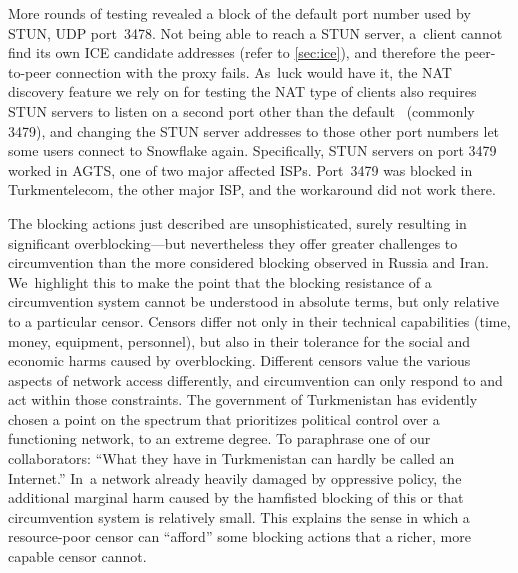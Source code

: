 \documentclass[letterpaper,twocolumn]{article}
\begin{document}
More rounds of testing revealed a block of the default port number
used by STUN, UDP port~3478.
Not being able to reach a STUN server,
a~client cannot find its own ICE candidate addresses
(refer to \autoref{sec:ice}),
and therefore the peer-to-peer connection with the proxy fails.
As~luck would have it, the NAT discovery feature we rely on
for testing the NAT type of clients also requires
STUN servers to listen on a second port other than the default~\cite[\S 6]{rfc5780}
(commonly 3479),
and changing the STUN server addresses to those other port numbers
let some users connect to Snowflake again.
Specifically, STUN servers on port 3479 worked in AGTS,
one of two major affected ISPs.
Port~3479 was blocked in Turkmentelecom, the other major ISP,
and the workaround did not work there.


The blocking actions just described are unsophisticated,
surely resulting in significant overblocking---but
nevertheless they offer greater challenges to circumvention
than the more considered blocking observed in Russia and Iran.
We~highlight this to make the point that the blocking resistance
of a circumvention system cannot be understood in absolute terms,
but only relative to a particular censor.
Censors differ not only in their technical capabilities
(time, money, equipment, personnel),
but also in their tolerance for the social and economic harms caused by overblocking.
Different censors value the various aspects of network access differently,
and circumvention can only respond to and act within those constraints.
The government of Turkmenistan has evidently chosen
a point on the spectrum that prioritizes political control
over a functioning network, to an extreme degree.
To paraphrase one of our collaborators:
``What they have in Turkmenistan can hardly be called an Internet.''
In~a network already heavily damaged by oppressive policy,
the additional marginal harm caused by the hamfisted blocking
of this or that circumvention system is relatively small.
This explains the sense in which a resource-poor censor
can ``afford'' some blocking actions
that a richer, more capable censor cannot.
\end{document}
